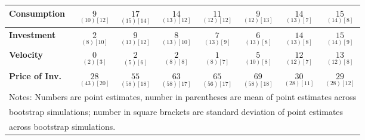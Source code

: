 \documentclass{article}
\begin{document}
\begin{tabular}{|l|c|@{}c|c|@{}c|c|@{}c|c|}
 \textbf{Consumption} & $\underset{( 10) [ 12]}{  9}$ & $\underset{( 15) [ 14]}{ 17}$ & $\underset{( 13) [ 12]}{ 14}$ & $\underset{( 12) [ 12]}{ 11}$ & $\underset{( 12) [ 13]}{  9}$ & $\underset{( 13) [  7]}{ 14}$ & $\underset{( 14) [  8]}{ 15}$ \\ \hline 
 \textbf{Investment} & $\underset{(  8) [ 10]}{  2}$ & $\underset{( 13) [ 12]}{  9}$ & $\underset{( 13) [ 10]}{  8}$ & $\underset{( 13) [  9]}{  7}$ & $\underset{( 13) [  8]}{  6}$ & $\underset{( 13) [  8]}{ 14}$ & $\underset{( 14) [  9]}{ 15}$ \\ \hline 
 \textbf{Velocity} & $\underset{(  2) [  3]}{  0}$ & $\underset{(  5) [  6]}{  2}$ & $\underset{(  8) [  8]}{  2}$ & $\underset{(  8) [  7]}{  1}$ & $\underset{( 10) [  8]}{  5}$ & $\underset{( 12) [  7]}{ 12}$ & $\underset{( 12) [  8]}{ 13}$ \\ \hline 
 \textbf{Price of Inv.} & $\underset{( 43) [ 20]}{ 28}$ & $\underset{( 58) [ 18]}{ 55}$ & $\underset{( 58) [ 17]}{ 63}$ & $\underset{( 56) [ 17]}{ 65}$ & $\underset{( 58) [ 18]}{ 69}$ & $\underset{( 28) [ 11]}{ 30}$ & $\underset{( 28) [ 12]}{ 29}$ \\ \hline 
 \multicolumn{8}{|l|}{Notes: Numbers are point estimates, number in 
 parentheses are mean of point estimates across} \\ \hline 
 \multicolumn{8}{|l|}{bootstrap simulations; number in square brackets are 
 standard deviation of point estimates} \\ \hline 
 \multicolumn{8}{|l|}{across bootstrap simulations.} \\ \hline 
 \end{tabular} 
\end{document}
